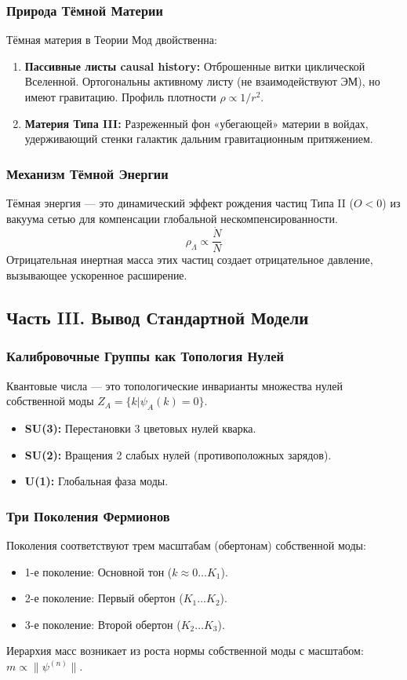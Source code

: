 \documentclass[12pt,a4paper]{article}
\begin{document}
\subsubsection{Природа Тёмной Материи}
Тёмная материя в Теории Мод двойственна:
\begin{enumerate}
    \item \textbf{Пассивные листы causal history:} Отброшенные витки циклической Вселенной. Ортогональны активному листу (не взаимодействуют ЭМ), но имеют гравитацию. Профиль плотности $\rho \propto 1/r^2$.
    \item \textbf{Материя Типа III:} Разреженный фон «убегающей» материи в войдах, удерживающий стенки галактик дальним гравитационным притяжением.
\end{enumerate}

\subsubsection{Механизм Тёмной Энергии}
Тёмная энергия — это динамический эффект рождения частиц Типа II ($O < 0$) из вакуума сетью для компенсации глобальной нескомпенсированности.
\begin{equation}
    \rho_\Lambda \propto \frac{\dot{N}}{N}
\end{equation}
Отрицательная инертная масса этих частиц создает отрицательное давление, вызывающее ускоренное расширение.

\subsection{Часть III. Вывод Стандартной Модели}

\subsubsection{Калибровочные Группы как Топология Нулей}
Квантовые числа — это топологические инварианты множества нулей собственной моды $Z_A = \{k | \psi_A(k)=0\}$.
\begin{itemize}
    \item \textbf{SU(3):} Перестановки 3 цветовых нулей кварка.
    \item \textbf{SU(2):} Вращения 2 слабых нулей (противоположных зарядов).
    \item \textbf{U(1):} Глобальная фаза моды.
\end{itemize}

\subsubsection{Три Поколения Фермионов}
Поколения соответствуют трем масштабам (обертонам) собственной моды:
\begin{itemize}
    \item 1-е поколение: Основной тон ($k \approx 0 \dots K_1$).
    \item 2-е поколение: Первый обертон ($K_1 \dots K_2$).
    \item 3-е поколение: Второй обертон ($K_2 \dots K_3$).
\end{itemize}
Иерархия масс возникает из роста нормы собственной моды с масштабом: $m \propto \|\psi^{(n)}\|$.
\end{document}
